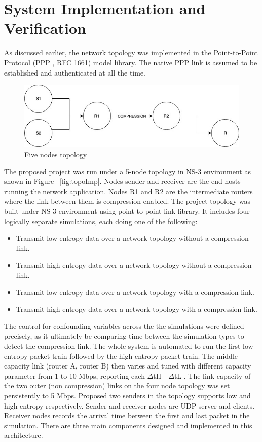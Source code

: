 \documentclass[sigconf]{acmart}
\begin{document}
\section{System Implementation and Verification}
As discussed earlier, the network topology was implemented in the Point-to-Point Protocol (PPP , RFC 1661) \cite{point1991autonet} model library. The native PPP link is assumed to be established and authenticated at all the time. 
\begin{figure}[h]
  \centering
  \includegraphics[width=\linewidth]{topoImp}
  \caption{Five nodes topology}
  \label{topoImp}
\end{figure}

The proposed project was run under a 5-node topology in NS-3 environment as shown in Figure ~\ref{fig:topoImp}. Nodes sender and receiver are the end-hosts running the network application. Nodes R1 and R2 are the intermediate routers where the link between them is compression-enabled. The project topology was built under NS-3 environment using point to point link library. It includes four logically separate simulations, each doing one of the following: 
\begin{itemize}
\item Transmit low entropy data over a network topology without a compression link.
\item Transmit high entropy data over a network topology without a compression link. 
\item Transmit low entropy data over a network topology with a compression link. 
\item Transmit high entropy data over a network topology with a compression link.
\end{itemize}

The control for confounding variables across the the simulations were defined precisely, as it ultimately be comparing time between the  simulation types to detect the compression link. The whole system is automated to run the first low entropy packet train followed by the high entropy packet train. 
The middle capacity link (router A, router B) then varies and tuned with different capacity parameter from 1 to 10 Mbps, reporting each $\Delta$tH - $\Delta$tL . The link capacity of the two outer (non compression) links on the four node topology was set persistently to 5 Mbps. Proposed two senders in the topology supports low and high entropy respectively. Sender and receiver nodes are UDP server and clients. Receiver nodes records the arrival time between the first and last packet in the simulation. There are three main components designed and implemented in this architecture.
\end{document}
